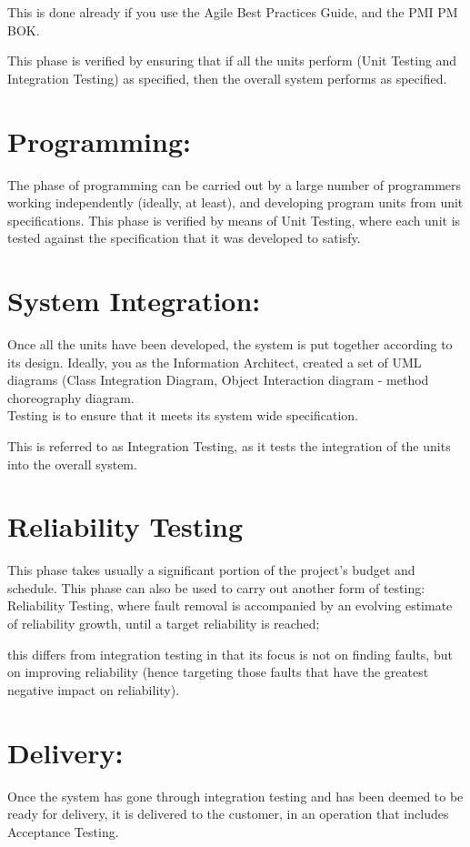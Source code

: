 This is done already if you use the Agile Best Practices Guide, and the PMI PM BOK.

This phase is verified by ensuring that if all the units perform (Unit Testing and Integration Testing) as specified, then the overall system performs as specified.

\section{Programming:} 
The phase of programming can be carried out by a large number of programmers working independently (ideally, at least), and developing program units from unit specifications. This phase is verified by means of Unit Testing, where each unit is tested against the specification that it was developed to satisfy.

\section{System Integration:} 
Once all the units have been developed, the system is put together according to its design.
Ideally, you as the Information Architect, created a set of UML diagrams (Class Integration Diagram, Object Interaction diagram - method choreography diagram.
\\
Testing is to ensure that it meets its system wide specification. 

This is referred to as Integration Testing, as it tests the integration of the units into the overall system. 
\section{Reliability Testing}
This phase takes usually a significant portion of the project’s budget and schedule. This phase can also be used to carry out another form of testing: Reliability Testing, where fault removal is accompanied by an evolving estimate of reliability growth, until a target reliability is reached;

this differs from integration testing in that its focus is not on finding faults, but on improving reliability (hence targeting those faults that have the greatest negative impact on reliability).


\section{Delivery: } Once the system has gone through integration testing and has been deemed to be ready for delivery, it is delivered to the customer, in an operation that includes Acceptance Testing. 

